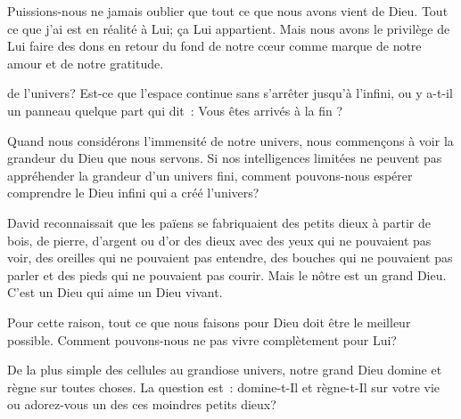 Puissions-nous ne jamais oublier que tout ce que nous avons vient de Dieu.
 Tout ce que j'ai est en réalité à Lui; ça Lui appartient.
 Mais nous avons le privilège de Lui faire des dons en retour
 \ocadr du fond de notre c\oe{}ur \fcadr{} comme marque de notre amour
 et de notre gratitude. 

\dvrule






 de l'univers?
 Est-ce que l'espace continue sans s'arrêter jusqu'à l'infini,
 ou y a-t-il un panneau quelque part qui dit~:
 \og Vous êtes arrivés à la fin \fg{} ? 

Quand nous considérons l'immensité de notre univers,
 nous commençons à voir la grandeur du Dieu que nous servons.
 Si nos intelligences limitées ne peuvent pas appréhender
 la grandeur d'un univers fini, comment pouvons-nous espérer
 comprendre le Dieu infini qui a créé l'univers? 

David reconnaissait que les païens se fabriquaient des petits dieux
 à partir de bois, de pierre, d'argent ou d'or \ocadr des dieux avec des yeux
 qui ne pouvaient pas voir, des oreilles qui ne pouvaient pas entendre,
 des bouches qui ne pouvaient pas parler et des pieds
 qui ne pouvaient pas courir. Mais le nôtre est un grand Dieu.
 C'est un Dieu qui aime \ocadr un Dieu vivant. 


Pour cette raison, tout ce que nous faisons pour Dieu
 doit être le meilleur possible.
 Comment pouvons-nous ne pas vivre complètement pour Lui? 

De la plus simple des cellules au grandiose univers,
 notre grand Dieu domine et règne sur toutes choses.
 La question est~: domine-t-Il et règne-t-Il sur votre vie
 \ocadr ou adorez-vous un des ces moindres petits dieux? 

